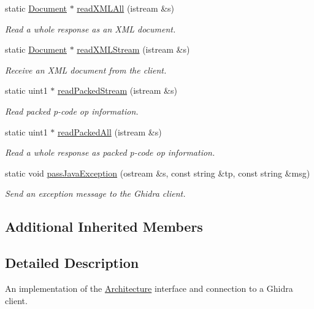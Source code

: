 \begin{DoxyCompactItemize}
static \mbox{\hyperlink{class_document}{Document}} $\ast$ \mbox{\hyperlink{class_architecture_ghidra_ae71b65457955432775931afde0d1c933}{read\+X\+M\+L\+All}} (istream \&s)
\begin{DoxyCompactList}\small\item\em Read a whole response as an X\+ML document. \end{DoxyCompactList}\item 
static \mbox{\hyperlink{class_document}{Document}} $\ast$ \mbox{\hyperlink{class_architecture_ghidra_a76b1d30cc0f0f69f003ba3aceccd8063}{read\+X\+M\+L\+Stream}} (istream \&s)
\begin{DoxyCompactList}\small\item\em Receive an X\+ML document from the client. \end{DoxyCompactList}\item 
static uint1 $\ast$ \mbox{\hyperlink{class_architecture_ghidra_a363a85f21c006421b43cec46fe82df10}{read\+Packed\+Stream}} (istream \&s)
\begin{DoxyCompactList}\small\item\em Read packed p-\/code op information. \end{DoxyCompactList}\item 
static uint1 $\ast$ \mbox{\hyperlink{class_architecture_ghidra_ae2bca9976342b1edd992bf084a028b0b}{read\+Packed\+All}} (istream \&s)
\begin{DoxyCompactList}\small\item\em Read a whole response as packed p-\/code op information. \end{DoxyCompactList}\item 
static void \mbox{\hyperlink{class_architecture_ghidra_afed66db0ba46a6c4bb1c42e173d021fa}{pass\+Java\+Exception}} (ostream \&s, const string \&tp, const string \&msg)
\begin{DoxyCompactList}\small\item\em Send an exception message to the Ghidra client. \end{DoxyCompactList}\end{DoxyCompactItemize}
\subsection*{Additional Inherited Members}


\subsection{Detailed Description}
An implementation of the \mbox{\hyperlink{class_architecture}{Architecture}} interface and connection to a Ghidra client. 

